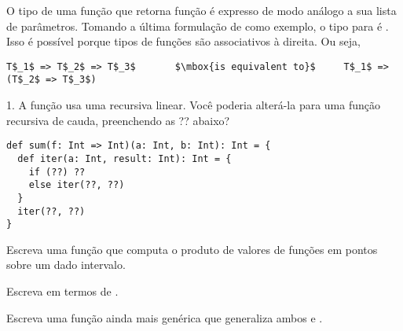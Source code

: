 O tipo de uma fun\c{c}\~{a}o que retorna fun\c{c}\~{a}o \'{e} expresso de modo an\'{a}logo a sua lista
de par\^{a}metros. Tomando a \'{u}ltima formula\c{c}\~{a}o de  como exemplo, o tipo 
para  \'{e} .
Isso \'{e} poss\'{i}vel porque tipos de fun\c{c}\~{o}es s\~{a}o associativos à direita. Ou seja, 
\begin{lstlisting}
T$_1$ => T$_2$ => T$_3$       $\mbox{is equivalent to}$     T$_1$ => (T$_2$ => T$_3$)
\end{lstlisting}

\begin{exercise}
1. A fun\c{c}\~{a}o  usa uma recursiva linear. Voc\^{e} poderia alter\'{a}-la
para uma fun\c{c}\~{a}o recursiva de cauda, preenchendo as ?? abaixo?  
\begin{lstlisting}
def sum(f: Int => Int)(a: Int, b: Int): Int = {
  def iter(a: Int, result: Int): Int = {
    if (??) ??
    else iter(??, ??)
  }
  iter(??, ??)
}
\end{lstlisting}
\end{exercise}

\begin{exercise}
Escreva uma fun\c{c}\~{a}o  que computa o produto de valores de
fun\c{c}\~{o}es em pontos sobre um dado intervalo.  
\end{exercise}

\begin{exercise}
Escreva  em termos de .  
\end{exercise}

\begin{exercise}
Escreva uma fun\c{c}\~{a}o ainda mais gen\'{e}rica que generaliza ambos  e .  
\end{exercise}

